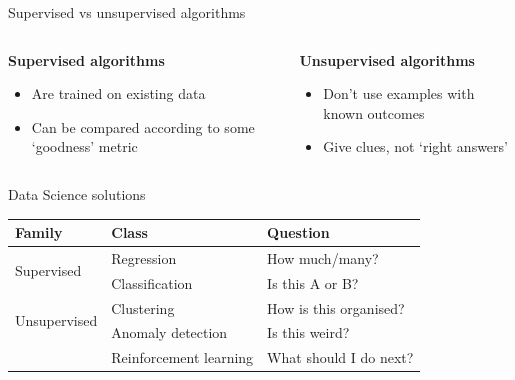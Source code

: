 \begin{frame}{Supervised vs unsupervised algorithms}
    \begin{columns}
        \begin{column}{0.5\textwidth}
            \begin{center}
                \large\bf%
                Supervised algorithms
            \end{center}
            \begin{itemize}
                \item Are trained on existing data
                \item Can be compared according to some `goodness' metric
            \end{itemize}
        \end{column}
        \begin{column}{0.5\textwidth}
            \begin{center}
                \large\bf%
                Unsupervised algorithms
            \end{center}
            \begin{itemize}
                \item Don't use examples with known outcomes
                \item Give clues, not `right answers'
            \end{itemize}
        \end{column}
    \end{columns}
\end{frame}

\begin{frame}{Data Science solutions}
    \begin{center}
        \begin{tabular}{lll}
            \toprule
            \textbf{Family}               & \textbf{Class}         & \textbf{Question} \\
            \midrule
            \multirow{2}{*}{Supervised}   & Regression             & How much/many? \\
                                          & Classification         & Is this A or B? \\
            \midrule
            \multirow{2}{*}{Unsupervised} & Clustering             & How is this organised? \\
                                          & Anomaly detection      & Is this weird? \\
            \midrule
                                          & Reinforcement learning & What should I do next? \\
            \bottomrule
        \end{tabular}
    \end{center}
\end{frame}

